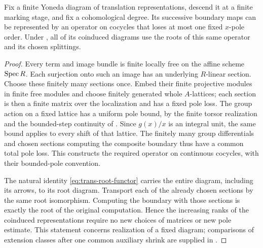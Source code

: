 \begin{lemma}
\label{lem:trans-diagram-bound}
Fix a finite Yoneda diagram of translation representations, descend
it at a finite marking stage, and fix a cohomological degree.  Its
successive boundary maps can be represented by an operator on
cocycles that loses at most one fixed $x$-pole order.  Under
, all of its coinduced diagrams use the roots
of this same operator and its chosen splittings.
\end{lemma}

\begin{proof}
Every term and image bundle is finite locally free on the affine
scheme $\operatorname{Spec} R$.  Each surjection onto such an image has an
underlying $R$-linear section.  Choose these finitely many sections
once.  Embed their finite projective modules in finite free modules
and choose finitely generated whole $A$-lattices; each section is
then a finite matrix over the localization and has a fixed pole
loss.  The group action on a fixed lattice has a uniform pole bound,
by the finite torsor realization and the bounded-step continuity of
.  Since $g(x)/x$ is an
integral unit, the same bound applies to every shift of that lattice.
The finitely many group differentials and chosen sections computing
the composite boundary thus have a common total pole loss.  This
constructs the required operator on continuous cocycles, with their
bounded-pole convention.

The natural identity \cref{eq:trans-root-functor} carries the entire
diagram, including its arrows, to its root diagram.  Transport each
of the already chosen sections by the same root isomorphism.
Computing the boundary with those sections is exactly the root of
the original computation.  Hence the increasing ranks of the
coinduced representations require no new choices of matrices or
new pole estimate.  This statement concerns realization of a fixed
diagram; comparisons of extension classes after one common
auxiliary shrink are supplied in .
\end{proof}
